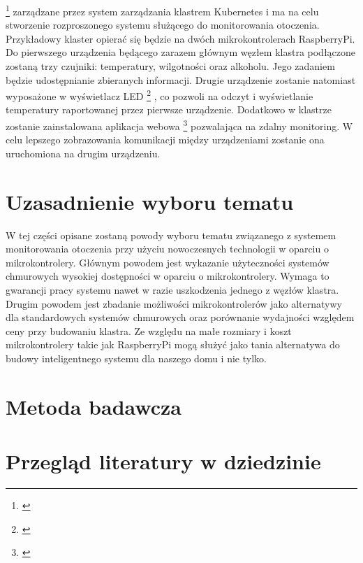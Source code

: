 \documentclass[12pt]{report}
\let\Oldsection\section
\renewcommand{\section}{\FloatBarrier\Oldsection}
\begin{document}
	\footnote{\cite{docker}}
zarządzane przez system zarządzania klastrem Kubernetes i ma na celu stworzenie rozproszonego systemu służącego do monitorowania otoczenia. Przykładowy klaster opierać się będzie na dwóch mikrokontrolerach RaspberryPi. Do pierwszego urządzenia będącego zarazem głównym węzłem klastra podłączone zostaną trzy czujniki: temperatury, wilgotności oraz alkoholu. Jego zadaniem będzie udostępnianie zbieranych informacji. Drugie urządzenie zostanie natomiast wyposażone w wyświetlacz LED
	\footnote{\cite{led}}
, co pozwoli na odczyt i wyświetlanie temperatury raportowanej przez pierwsze urządzenie. Dodatkowo w klastrze zostanie zainstalowana aplikacja webowa
\footnote{\cite{webapp}}
pozwalająca na zdalny monitoring. W celu lepszego zobrazowania komunikacji między urządzeniami zostanie ona uruchomiona na drugim urządzeniu.

\section{Uzasadnienie wyboru tematu}
W tej części opisane zostaną powody wyboru tematu związanego z systemem monitorowania otoczenia przy użyciu nowoczesnych technologii w oparciu o mikrokontrolery. Głównym powodem jest wykazanie użyteczności systemów chmurowych wysokiej dostępności w oparciu o mikrokontrolery. Wymaga to gwarancji pracy systemu nawet w razie uszkodzenia jednego z węzłów klastra. Drugim powodem jest zbadanie możliwości mikrokontrolerów jako alternatywy dla standardowych systemów chmurowych oraz porównanie wydajności względem ceny przy budowaniu klastra. Ze względu na małe rozmiary i koszt mikrokontrolery takie jak RaspberryPi mogą służyć jako tania alternatywa do budowy inteligentnego systemu dla naszego domu i nie tylko.

\section{Metoda badawcza}

\section{Przegląd literatury w dziedzinie}
\end{document}
